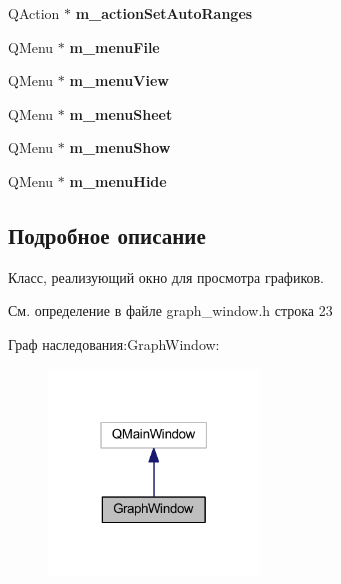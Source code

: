 \begin{DoxyCompactItemize}
\item 
\hypertarget{class_graph_window_add86d9623399b3aaace9c961c2c56d9f}{}\label{class_graph_window_add86d9623399b3aaace9c961c2c56d9f} 
Q\+Action $\ast$ {\bfseries m\+\_\+action\+Set\+Auto\+Ranges}
\item 
\hypertarget{class_graph_window_a2cfe856a0c10dfffb05e4a568d135feb}{}\label{class_graph_window_a2cfe856a0c10dfffb05e4a568d135feb} 
Q\+Menu $\ast$ {\bfseries m\+\_\+menu\+File}
\item 
\hypertarget{class_graph_window_a3e2ffe57452e156a0d62fb82da8ed868}{}\label{class_graph_window_a3e2ffe57452e156a0d62fb82da8ed868} 
Q\+Menu $\ast$ {\bfseries m\+\_\+menu\+View}
\item 
\hypertarget{class_graph_window_ae3c17a4c2fc6e3f935dc3b3f7cc89974}{}\label{class_graph_window_ae3c17a4c2fc6e3f935dc3b3f7cc89974} 
Q\+Menu $\ast$ {\bfseries m\+\_\+menu\+Sheet}
\item 
\hypertarget{class_graph_window_a4078c2f892ffb57912412fb0c38af5ba}{}\label{class_graph_window_a4078c2f892ffb57912412fb0c38af5ba} 
Q\+Menu $\ast$ {\bfseries m\+\_\+menu\+Show}
\item 
\hypertarget{class_graph_window_a2df057f6b70c12d9190a456a7f62b9c4}{}\label{class_graph_window_a2df057f6b70c12d9190a456a7f62b9c4} 
Q\+Menu $\ast$ {\bfseries m\+\_\+menu\+Hide}
\end{DoxyCompactItemize}


\subsection{Подробное описание}
Класс, реализующий окно для просмотра графиков. 

См. определение в файле graph\+\_\+window.\+h строка 23



Граф наследования\+:Graph\+Window\+:
\nopagebreak
\begin{figure}[H]
\begin{center}
\leavevmode
\includegraphics[width=159pt]{class_graph_window__inherit__graph}
\end{center}
\end{figure}


